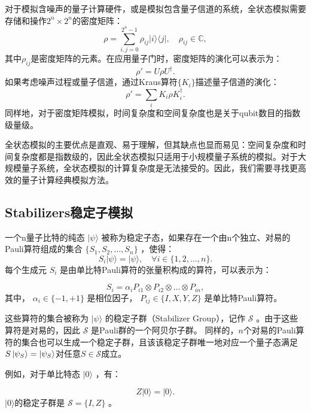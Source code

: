 对于模拟含噪声的量子计算硬件，或是模拟包含量子信道的系统，全状态模拟需要存储和操作$2^n \times 2^n$的密度矩阵：
\begin{equation}
    \rho = \sum_{i,j=0}^{2^n-1} \rho_{ij} |i\rangle\langle j|,
    \quad \rho_{ij} \in \mathbb{C},
\end{equation}
其中$\rho_{ij}$是密度矩阵的元素。在应用量子门时，密度矩阵的演化可以表示为：
\begin{equation}
    \rho' = U \rho U^\dagger.
\end{equation}
如果考虑噪声过程或量子信道，通过Kraus算符$\{K_i\}$描述量子信道的演化：
\begin{equation}
    \rho' = \sum_i K_i \rho K_i^\dagger.
\end{equation}
同样地，对于密度矩阵模拟，时间复杂度和空间复杂度也是关于qubit数目的指数级量级。

全状态模拟的主要优点是直观、易于理解，但其缺点也显而易见：空间复杂度和时间复杂度都是指数级的，因此全状态模拟只适用于小规模量子系统的模拟。对于大规模量子系统，全状态模拟的计算复杂度是无法接受的。因此，我们需要寻找更高效的量子计算经典模拟方法。

\subsection{Stabilizers稳定子模拟}


一个n量子比特的纯态  $|\psi\rangle $ 被称为稳定子态，如果存在一个由n个独立、对易的Pauli算符组成的集合  $\{S_1, S_2, …, S_n\}$ ，使得：
\begin{equation}
    S_i |\psi\rangle = |\psi\rangle, \quad \forall i \in \{1, 2, …, n\}.
\end{equation}
每个生成元  $S_i$  是由单比特Pauli算符的张量积构成的算符，可以表示为：

\begin{equation}
    S_i = \alpha_i P_{i1} \otimes P_{i2} \otimes … \otimes P_{in},
\end{equation}
其中，  $\alpha_i\in\{-1,+1\}$  是相位因子，  $P_{ij}\in\{I, X, Y, Z\}$  是单比特Pauli算符。


这些算符的集合被称为  $|\psi\rangle $ 的稳定子群（Stabilizer Group），记作 $ \mathcal{S}$ 。由于这些算符是对易的，因此  $\mathcal{S}$  是Pauli群的一个阿贝尔子群。
同样的，$n$个对易的Pauli算符的集合也可以生成一个稳定子群，且该该稳定子群唯一地对应一个量子态满足$S\ket{\psi_S}=\ket{\psi_S}$对任意$S\in\mathcal{S}$成立。


例如，对于单比特态  $|0\rangle$ ，有：

\begin{equation}
    Z |0\rangle = |0\rangle.
\end{equation}
$|0\rangle$的稳定子群是 $\mathcal{S} = \{I,Z\}$ 。


